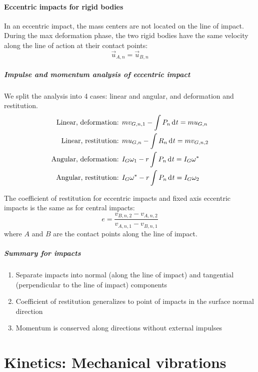 \documentclass[10pt, twocolumn]{article}
\begin{document}
\subsection{Eccentric impacts for rigid bodies}
In an eccentric impact, the mass centers are not located on the line of impact.
During the max deformation phase, the two rigid bodies have the same velocity along the line of action at their contact points:
\[
  \vec{u}_{A,n} = \vec{u}_{B,n}
\]

\subsubsection{Impulse and momentum analysis of eccentric impact}
We split the analysis into 4 cases: linear and angular, and deformation and restitution.
\begin{align*}
  \text{Linear, deformation: }  & m v_{G,n,1} - \int{P_n \,\mathrm{d}^{} t} =  m u_{G,n}     \\
  \text{Linear, restitution: }  & m u_{G,n} - \int{R_n \,\mathrm{d}^{} t} =  m v_{G,n,2}     \\
  \text{Angular, deformation: } & I_G \omega_1 - r\int{P_n \,\mathrm{d}^{} t} =  I_G\omega^* \\
  \text{Angular, restitution: } & I_G \omega^* - r\int{P_n \,\mathrm{d}^{} t} =  I_G\omega_2
\end{align*}

The coefficient of restitution for eccentric impacts and fixed axis eccentric impacts is the same as for central impacts:
\[
  e = \frac{v_{B,n,2} - v_{A,n,2}}{v_{A,n,1} - v_{B,n,1}}
\]
where \(A\) and \(B\) are the contact points along the line of impact.


\subsubsection{Summary for impacts}
\begin{enumerate}
  \item Separate impacts into normal (along the line of impact) and tangential (perpendicular to the line of impact) components
  \item Coefficient of restitution generalizes to point of impacts in the surface normal direction
  \item Momentum is conserved along directions without external impulses
\end{enumerate}


\part{Kinetics: Mechanical vibrations}
\end{document}
